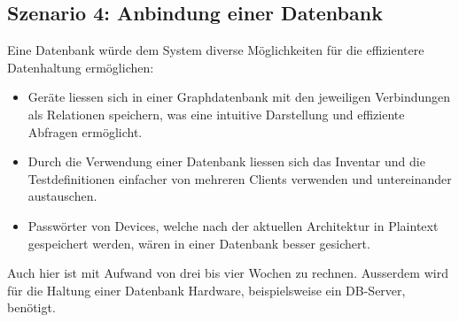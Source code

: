 \documentclass[
	ngerman,
	toc=listof, %
	toc=bibliography, %
	footnotes=multiple, %
	parskip=half, %
	numbers=noendperiod %
]{scrartcl}
\begin{document}
	\subsection{Szenario 4: Anbindung einer Datenbank}
	Eine Datenbank würde dem System diverse Möglichkeiten für die effizientere Datenhaltung ermöglichen:
	\begin{itemize}
		\item Geräte liessen sich in einer Graphdatenbank mit den jeweiligen Verbindungen als Relationen speichern, was eine intuitive Darstellung und effiziente Abfragen ermöglicht.
		\item Durch die Verwendung einer Datenbank liessen sich das Inventar und die Testdefinitionen einfacher von mehreren Clients verwenden und untereinander austauschen.
		\item Passwörter von Devices, welche nach der aktuellen Architektur in Plaintext gespeichert werden, wären in einer Datenbank besser gesichert.
	\end{itemize}
	Auch hier ist mit Aufwand von drei bis vier Wochen zu rechnen. 
	Ausserdem wird für die Haltung einer Datenbank Hardware, beispielsweise ein DB-Server, benötigt.
	

	
\end{document}
